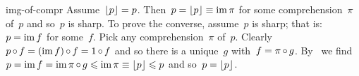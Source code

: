 \begin{solution}{img-of-compr}%
Assume~$\left\lfloor p\right\rfloor = p$.
    Then~$p = \left\lfloor p\right\rfloor \equiv \operatorname{im} \pi$ for some comprehension~$\pi$ of~$p$
        and so~$p$ is sharp.
To prove the converse, assume~$p$ is sharp;
    that is: $p = \operatorname{im} f$ for some~$f$.
Pick any comprehension~$\pi$ of~$p$.
    Clearly~$p \mathop{\circ} f = (\operatorname{im} f) \mathop{\circ} f = 1 \mathop{\circ} f$
        and so there is a unique~$g$ with~$f = \pi \mathop{\circ} g$.
    By~
        we find~$p = \operatorname{im} f = \operatorname{im} \pi \mathop{\circ} g \leqslant \operatorname{im} \pi \equiv \left\lfloor p\right\rfloor \leqslant p$
        and so~$p = \left\lfloor p\right\rfloor$.
\end{solution}


